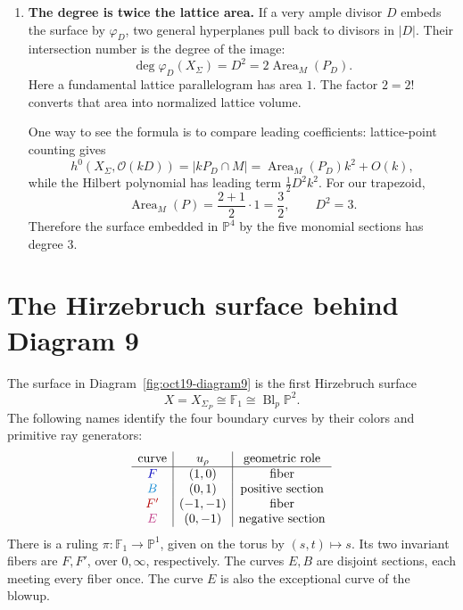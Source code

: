 \documentclass[11pt]{article}
\theoremstyle{definition}
\theoremstyle{remark}
\DeclareMathOperator{\Bl}{Bl}
\newcommand{\Sg}{\Sigma}
\newcommand{\cO}{\mathcal{O}}
\newcommand{\bP}{\mathbb{P}}
\newcommand{\bF}{\mathbb{F}}
\newcommand{\vf}{\varphi}
\newcommand{\isom}{\cong}
\begin{document}
\begin{enumerate}
    \item \textbf{The degree is twice the lattice area.}
    If a very ample divisor \(D\) embeds the surface by \(\vf_D\),
    two general hyperplanes pull back to divisors in \(|D|\).
    Their intersection number is the degree of the image:
    \[
        \deg\vf_D(X_\Sg)=D^2
           =2\operatorname{Area}_M(P_D).
    \]
    Here a fundamental lattice parallelogram has area \(1\).
    The factor \(2=2!\) converts that area into normalized lattice
    volume.

    One way to see the formula is to compare leading coefficients:
    lattice-point counting gives
    \[
        h^0(X_\Sg,\cO(kD))
           =|kP_D\cap M|
           =\operatorname{Area}_M(P_D)k^2+O(k),
    \]
    while the Hilbert polynomial has leading term
    \(\tfrac12D^2k^2\).
    For our trapezoid,
    \[
        \operatorname{Area}_M(P)=\frac{2+1}{2}\cdot1=\frac32,
        \qquad\boxed{D^2=3.}
    \]
    Therefore the surface embedded in \(\bP^4\) by the five
    monomial sections has degree \(3\).
\end{enumerate}

\section{The Hirzebruch surface behind Diagram 9}

The surface in Diagram~\ref{fig:oct19-diagram9} is the first Hirzebruch
surface
\[
    X=X_{\Sigma_P}\isom\bF_1\isom\Bl_p\bP^2.
\]
The following names identify the four boundary curves by their colors
and primitive ray generators:
\[
    \begin{array}{c|c|c}
        \text{curve}&u_\rho&\text{geometric role}\\ \hline
        \textcolor{blue!75!black}{F}&(1,0)&\text{fiber}\\
        \textcolor{cyan!70!blue}{B}&(0,1)&\text{positive section}\\
        \textcolor{red!70!black}{F'}&(-1,-1)&\text{fiber}\\
        \textcolor{magenta!75!black}{E}&(0,-1)&\text{negative section}
    \end{array}
\]
There is a ruling \(\pi:\bF_1\to\bP^1\), given on the torus by
\((s,t)\mapsto s\). Its two invariant fibers are \(F,F'\), over
\(0,\infty\), respectively. The curves \(E,B\) are disjoint sections,
each meeting every fiber once. The curve \(E\) is also the exceptional
curve of the blowup.
\end{document}
